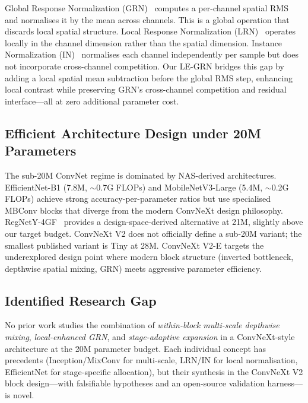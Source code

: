 \documentclass{article}
\begin{document}
Global Response Normalization (GRN)~\cite{woo2023convnextv2} computes
a per-channel spatial RMS and normalises it by the mean across
channels.  This is a global operation that discards local spatial
structure.  Local Response Normalization
(LRN)~\cite{krizhevsky2012alexnet} operates locally in the channel
dimension rather than the spatial dimension.
Instance Normalization (IN)~\cite{ulyanov2016instance} normalises each
channel independently per sample but does not incorporate cross-channel
competition.  Our LE-GRN bridges this gap by adding a local spatial
mean subtraction before the global RMS step, enhancing local contrast
while preserving GRN's cross-channel competition and residual
interface---all at zero additional parameter cost.

\subsection{Efficient Architecture Design under 20M Parameters}

The sub-20M ConvNet regime is dominated by NAS-derived architectures.
EfficientNet-B1 (7.8M, $\sim$0.7G FLOPs) and MobileNetV3-Large (5.4M,
$\sim$0.2G FLOPs) achieve strong accuracy-per-parameter ratios but use
specialised MBConv blocks that diverge from the modern ConvNeXt design
philosophy.  RegNetY-4GF~\cite{radosavovic2020regnet} provides a
design-space-derived alternative at 21M, slightly above our target
budget.  ConvNeXt V2 does not officially define a sub-20M variant;
the smallest published variant is Tiny at 28M.
ConvNeXt V2-E targets the underexplored design point where modern
block structure (inverted bottleneck, depthwise spatial mixing, GRN)
meets aggressive parameter efficiency.

\subsection{Identified Research Gap}

No prior work studies the combination of \emph{within-block multi-scale
depthwise mixing}, \emph{local-enhanced GRN}, and \emph{stage-adaptive
expansion} in a ConvNeXt-style architecture at the 20M parameter
budget.  Each individual concept has precedents (Inception/MixConv for
multi-scale, LRN/IN for local normalisation, EfficientNet for
stage-specific allocation), but their synthesis in the ConvNeXt V2
block design---with falsifiable hypotheses and an open-source
validation harness---is novel.

\end{document}
